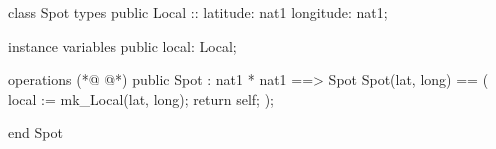 \begin{vdmpp}[breaklines=true]
class Spot
types
 public Local ::  latitude: nat1
          longitude: nat1;
            
instance variables
 public local: Local;
 
operations
(*@
\label{Spot:10}
@*)
 public Spot : nat1 * nat1 ==> Spot
  Spot(lat, long) == (
   local := mk_Local(lat, long);
  return self;
 );

end Spot
\end{vdmpp}
